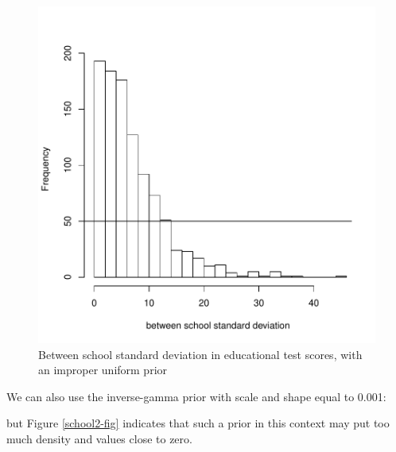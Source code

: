 \documentclass{article}
\begin{document}
\begin{figure}[!h]
\begin{center}
\includegraphics{Lecture8-011}
\end{center}
\caption{Between school standard deviation in educational test scores, with an improper uniform prior}
\label{school1-fig}
\end{figure}

We can also use the inverse-gamma prior with scale and shape equal to 0.001:

\begin{Schunk}
\end{Schunk}

but Figure \ref{school2-fig} indicates that such a prior in this context may put too much density and values close to zero.\\
\end{document}
